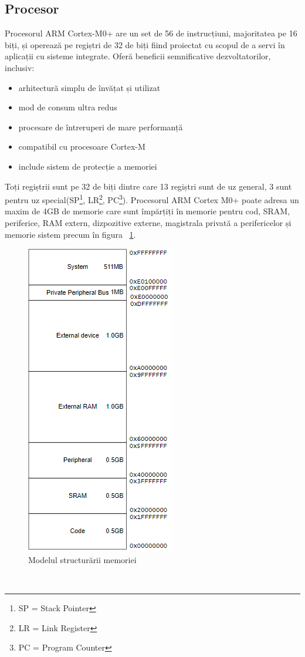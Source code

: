 \documentclass[12pt,a4paper]{report}
\begin{document}
\subsection{Procesor}
Procesorul ARM Cortex-M0+ are un set de 56 de instrucțiuni, majoritatea pe 16 biți, și operează pe regiștri de 32 de biți fiind proiectat cu scopul de a servi în aplicații cu sisteme integrate\cite{cpu}. Oferă beneficii semnificative dezvoltatorilor, inclusiv:
\begin{itemize}
	\item{arhitectură simplu de învățat și utilizat}
	\item{mod de consum ultra redus}
	\item{procesare de întreruperi de mare performanță}
	\item{compatibil cu procesoare Cortex-M}
	\item{include sistem de protecție a memoriei}
\end{itemize}
Toți regiștrii sunt pe 32 de biți dintre care 13 regiștri sunt de uz general, 3 sunt pentru uz special(SP\footnote{SP = Stack Pointer}, LR\footnote{LR = Link Register}, PC\footnote{PC = Program Counter}). Procesorul ARM Cortex M0+ poate adresa un maxim de 4GB de memorie care sunt împărțiți în memorie pentru cod, SRAM, periferice, RAM extern, dizpozitive externe, magistrala privată a perifericelor și memorie sistem precum în figura ~\ref{fig:memory}.
\begin{figure}[th]
\centering
\includegraphics[scale=0.7]{pics/memory_map.png}
  \caption{Modelul structurării memoriei\cite{memmap}}
  \label{fig:memory}
\end{figure} \\
\end{document}
